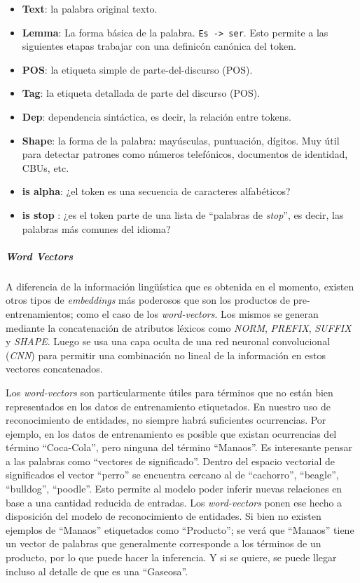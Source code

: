 \documentclass[12pt,a4paper,]{scrartcl}
\providecommand{\tightlist}{%
  \setlength{\itemsep}{0pt}\setlength{\parskip}{0pt}}
\let\oldsubparagraph\subparagraph
\renewcommand{\subparagraph}[1]{\oldsubparagraph{#1}\mbox{}}
\begin{document}
\begin{itemize}
\tightlist
\item
  \textbf{Text}: la palabra original texto.
\item
  \textbf{Lemma}: La forma básica de la palabra. \texttt{Es\ -\textgreater{}\ ser}. Esto permite a las siguientes etapas trabajar con una definicón canónica del token.
\item
  \textbf{POS}: la etiqueta simple de parte-del-discurso (POS).
\item
  \textbf{Tag}: la etiqueta detallada de parte del discurso (POS).
\item
  \textbf{Dep}: dependencia sintáctica, es decir, la relación entre tokens.
\item
  \textbf{Shape}: la forma de la palabra: mayúsculas, puntuación, dígitos. Muy útil para detectar patrones como números telefónicos, documentos de identidad, CBUs, etc.
\item
  \textbf{is alpha}: ¿el token es una secuencia de caracteres alfabéticos?
\item
  \textbf{is stop} : ¿es el token parte de una lista de \enquote{palabras de \emph{stop}}, es decir, las palabras más comunes del idioma?
\end{itemize}

\hypertarget{word-vectors}{%
\subparagraph{\texorpdfstring{\emph{Word Vectors}}{Word Vectors}}\label{word-vectors}}

A diferencia de la información lingüística que es obtenida en el momento, existen otros tipos de \emph{embeddings} más poderosos que son los productos de pre-entrenamientos; como el caso de los \emph{word-vectors}. Los mismos se generan mediante la concatenación de atributos léxicos como \emph{NORM}, \emph{PREFIX}, \emph{SUFFIX} y \emph{SHAPE}. Luego se usa una capa oculta de una red neuronal convolucional (\emph{CNN}) para permitir una combinación no lineal de la información en estos vectores concatenados.

Los \emph{word-vectors} son particularmente útiles para términos que no están bien representados en los datos de entrenamiento etiquetados. En nuestro uso de reconocimiento de entidades, no siempre habrá suficientes ocurrencias. Por ejemplo, en los datos de entrenamiento es posible que existan ocurrencias del término \enquote{Coca-Cola}, pero ninguna del término \enquote{Manaos}.
Es interesante pensar a las palabras como \enquote{vectores de significado}. Dentro del espacio vectorial de significados el vector \enquote{perro} se encuentra cercano al de \enquote{cachorro}, \enquote{beagle}, \enquote{bulldog}, \enquote{poodle}. Esto permite al modelo poder inferir nuevas relaciones en base a una cantidad reducida de entradas.
Los \emph{word-vectors} ponen ese hecho a disposición del modelo de reconocimiento de entidades. Si bien no existen ejemplos de \enquote{Manaos} etiquetados como \enquote{Producto}; se verá que \enquote{Manaos} tiene un vector de palabras que generalmente corresponde a los términos de un producto, por lo que puede hacer la inferencia. Y si se quiere, se puede llegar incluso al detalle de que es una \enquote{Gaseosa}.
\end{document}
